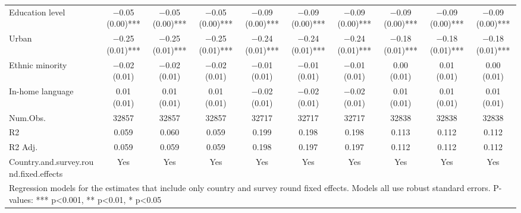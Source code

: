 \begin{table}
\begin{tabular}[t]{lccccccccc}
Education level & \num{-0.05} (\num{0.00})*** & \num{-0.05} (\num{0.00})*** & \num{-0.05} (\num{0.00})*** & \num{-0.09} (\num{0.00})*** & \num{-0.09} (\num{0.00})*** & \num{-0.09} (\num{0.00})*** & \num{-0.09} (\num{0.00})*** & \num{-0.09} (\num{0.00})*** & \num{-0.09} (\num{0.00})***\\
Urban & \num{-0.25} (\num{0.01})*** & \num{-0.25} (\num{0.01})*** & \num{-0.25} (\num{0.01})*** & \num{-0.24} (\num{0.01})*** & \num{-0.24} (\num{0.01})*** & \num{-0.24} (\num{0.01})*** & \num{-0.18} (\num{0.01})*** & \num{-0.18} (\num{0.01})*** & \num{-0.18} (\num{0.01})***\\
Ethnic minority & \num{-0.02} (\num{0.01}) & \num{-0.02} (\num{0.01}) & \num{-0.02} (\num{0.01}) & \num{-0.01} (\num{0.01}) & \num{-0.01} (\num{0.01}) & \num{-0.01} (\num{0.01}) & \num{0.00} (\num{0.01}) & \num{0.01} (\num{0.01}) & \num{0.00} (\num{0.01})\\
In-home language & \num{0.01} (\num{0.01}) & \num{0.01} (\num{0.01}) & \num{0.01} (\num{0.01}) & \num{-0.02} (\num{0.01}) & \num{-0.02} (\num{0.01}) & \num{-0.02} (\num{0.01}) & \num{0.01} (\num{0.01}) & \num{0.01} (\num{0.01}) & \num{0.01} (\num{0.01})\\
\midrule
Num.Obs. & \num{32857} & \num{32857} & \num{32857} & \num{32717} & \num{32717} & \num{32717} & \num{32838} & \num{32838} & \num{32838}\\
R2 & \num{0.059} & \num{0.060} & \num{0.059} & \num{0.199} & \num{0.198} & \num{0.198} & \num{0.113} & \num{0.112} & \num{0.112}\\
R2 Adj. & \num{0.059} & \num{0.059} & \num{0.059} & \num{0.198} & \num{0.197} & \num{0.197} & \num{0.112} & \num{0.112} & \num{0.112}\\
Country.and.survey.round.fixed.effects & Yes & Yes & Yes & Yes & Yes & Yes & Yes & Yes & Yes\\
\bottomrule
\multicolumn{10}{l}{\rule{0pt}{1em}Regression models for the estimates that include only country and survey round fixed effects. Models all use robust standard errors. P-values: *** p<0.001, ** p<0.01, * p<0.05}\\
\end{tabular}
\end{table}
